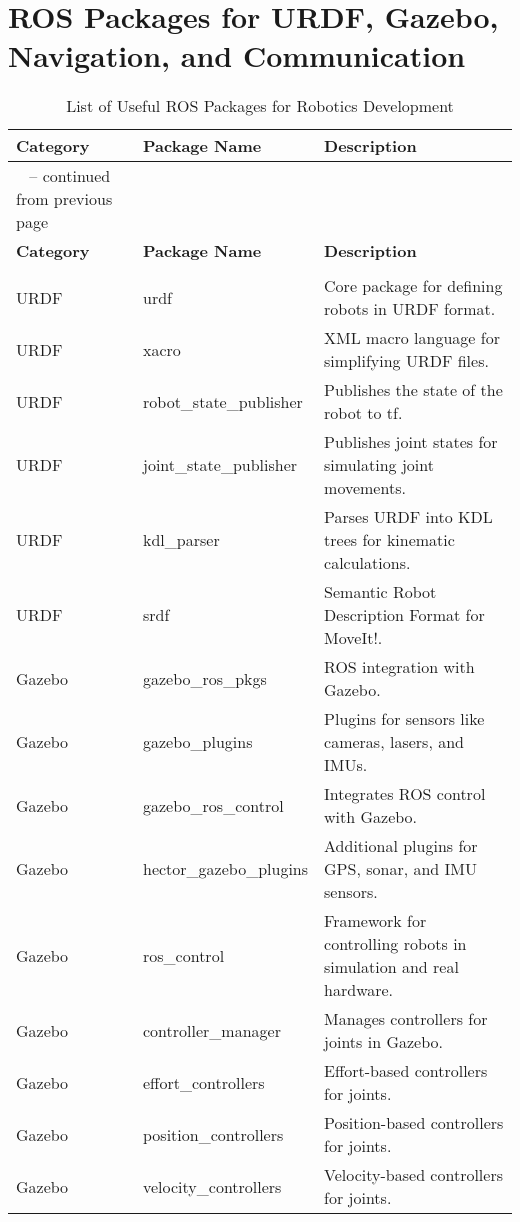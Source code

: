 \documentclass[../../main]{subfiles}
\begin{document}
\section*{ROS Packages for URDF, Gazebo, Navigation, and Communication}

\begin{longtable}{|>{\raggedright\arraybackslash}p{4cm}|>{\raggedright\arraybackslash}p{4cm}|p{7cm}|}
\caption{List of Useful ROS Packages for Robotics Development} \label{tab:ros_packages} \\

\hline
\textbf{Category} & \textbf{Package Name} & \textbf{Description} \\
\hline
\endfirsthead

\multicolumn{3}{c}%
{{\tablename\ \thetable{} -- continued from previous page}} \\
\hline
\textbf{Category} & \textbf{Package Name} & \textbf{Description} \\
\hline
\endhead

\hline
\multicolumn{3}{r}{{Continued on next page}} \\
\endfoot

\hline
\endlastfoot

URDF & urdf & Core package for defining robots in URDF format. \\
URDF & xacro & XML macro language for simplifying URDF files. \\
URDF & robot\_state\_publisher & Publishes the state of the robot to tf. \\
URDF & joint\_state\_publisher & Publishes joint states for simulating joint movements. \\
URDF & kdl\_parser & Parses URDF into KDL trees for kinematic calculations. \\
URDF & srdf & Semantic Robot Description Format for MoveIt!. \\

Gazebo & gazebo\_ros\_pkgs & ROS integration with Gazebo. \\
Gazebo & gazebo\_plugins & Plugins for sensors like cameras, lasers, and IMUs. \\
Gazebo & gazebo\_ros\_control & Integrates ROS control with Gazebo. \\
Gazebo & hector\_gazebo\_plugins & Additional plugins for GPS, sonar, and IMU sensors. \\
Gazebo & ros\_control & Framework for controlling robots in simulation and real hardware. \\
Gazebo & controller\_manager & Manages controllers for joints in Gazebo. \\
Gazebo & effort\_controllers & Effort-based controllers for joints. \\
Gazebo & position\_controllers & Position-based controllers for joints. \\
Gazebo & velocity\_controllers & Velocity-based controllers for joints. \\


\end{longtable}
\end{document}
